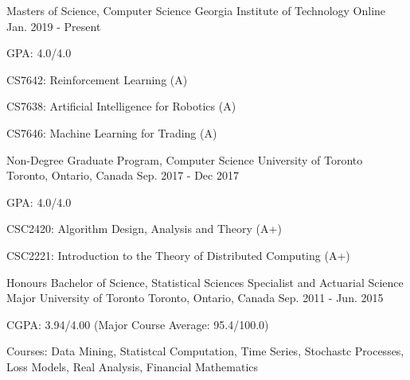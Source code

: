 
\begin{cventries}
  \cventry
    {Masters of Science, Computer Science} %
    {Georgia Institute of Technology} %
    {Online} %
    {Jan. 2019 - Present} %
    {GPA: 4.0/4.0\newline \hphantom{0}
      \begin{cvitems}
        \item {CS7642: Reinforcement Learning (A)}
        \item {CS7638: Artificial Intelligence for Robotics (A)}
        \item {CS7646: Machine Learning for Trading (A)}
      \end{cvitems}
    }
\end{cventries}

\begin{cventries}
  \cventry
    {Non-Degree Graduate Program, Computer Science} %
    {University of Toronto} %
    {Toronto, Ontario, Canada} %
    {Sep. 2017 - Dec 2017} %
    {GPA: 4.0/4.0\newline \hphantom{0}
      \begin{cvitems}
        \item {CSC2420: Algorithm Design, Analysis and Theory (A+)}
        \item {CSC2221: Introduction to the Theory of Distributed Computing (A+)}
      \end{cvitems}
    }
\end{cventries}

\begin{cventries}
  \cventry
    {Honours Bachelor of Science, Statistical Sciences Specialist and Actuarial Science Major} %
    {University of Toronto} %
    {Toronto, Ontario, Canada} %
    {Sep. 2011 - Jun. 2015} %
    {CGPA: 3.94/4.00 (Major Course Average: 95.4/100.0)\newline \hphantom{0}
      \begin{cvitems}
        \item {Courses: Data Mining, Statistcal Computation, Time Series, Stochastc Processes, Loss Models, Real Analysis, Financial Mathematics}
      \end{cvitems}
    }
\end{cventries}
